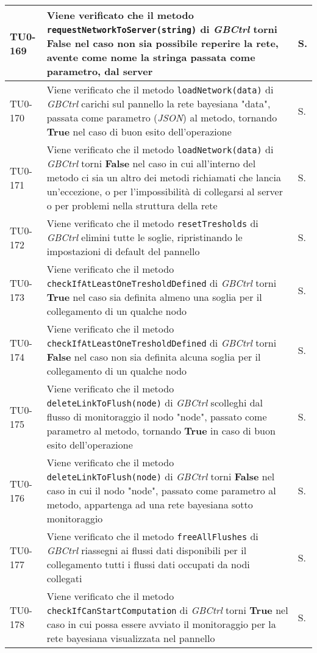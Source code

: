 \begin{longtable}{|C{.15\textwidth}|m{.66\textwidth}|C{.10\textwidth}|}
\hline
{}TU0-169 & Viene verificato che il metodo \texttt{requestNetworkToServer(string)} di \textit{GBCtrl} torni \textbf{False} nel caso non sia possibile reperire la rete, avente come nome la stringa passata come parametro, dal server & S.\\
\hline
TU0-170 & Viene verificato che il metodo \texttt{loadNetwork(data)} di \textit{GBCtrl} carichi sul pannello la rete bayesiana "data", passata come parametro (\textit{JSON}) al metodo, tornando \textbf{True} nel caso di buon esito dell'operazione & S.\\
\hline
{}TU0-171 & Viene verificato che il metodo \texttt{loadNetwork(data)} di \textit{GBCtrl} torni \textbf{False} nel caso in cui all'interno del metodo ci sia un altro dei metodi richiamati che lancia un'eccezione, o per l'impossibilità di collegarsi al server o per problemi nella struttura della rete  & S.\\
\hline
TU0-172 & Viene verificato che il metodo \texttt{resetTresholds} di \textit{GBCtrl} elimini tutte le soglie, ripristinando le impostazioni di default del pannello & S.\\
\hline
{}TU0-173 & Viene verificato che il metodo \texttt{checkIfAtLeastOneTresholdDefined} di \textit{GBCtrl} torni \textbf{True} nel caso sia definita almeno una soglia per il collegamento di un qualche nodo & S.\\
\hline
TU0-174 & Viene verificato che il metodo \texttt{checkIfAtLeastOneTresholdDefined} di \textit{GBCtrl} torni \textbf{False} nel caso non sia definita alcuna soglia per il collegamento di un qualche nodo & S.\\
\hline
{}TU0-175 & Viene verificato che il metodo \texttt{deleteLinkToFlush(node)} di \textit{GBCtrl} scolleghi dal flusso di monitoraggio il nodo "node", passato come parametro al metodo, tornando \textbf{True} in caso di buon esito dell'operazione & S.\\
\hline
TU0-176 & Viene verificato che il metodo \texttt{deleteLinkToFlush(node)} di \textit{GBCtrl} torni \textbf{False} nel caso in cui il nodo "node", passato come parametro al metodo, appartenga ad una rete bayesiana sotto monitoraggio & S.\\
\hline
{}TU0-177 & Viene verificato che il metodo \texttt{freeAllFlushes} di \textit{GBCtrl} riassegni ai flussi dati disponibili per il collegamento tutti i flussi dati occupati da nodi collegati & S.\\
\hline
TU0-178 & Viene verificato che il metodo \texttt{checkIfCanStartComputation} di \textit{GBCtrl} torni \textbf{True} nel caso in cui possa essere avviato il monitoraggio per la rete bayesiana visualizzata nel pannello & S.\\

\end{longtable}
